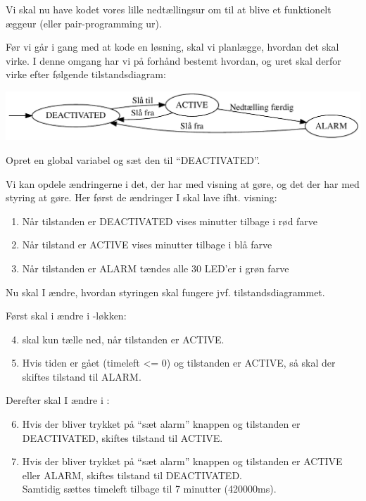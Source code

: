 \documentclass{ucph-handout}
\begin{document}
\begin{exercisebox}[adjusted title=Æggeur]
Vi skal nu have kodet vores lille nedtællingsur om til at blive et
funktionelt æggeur (eller pair-programming ur).

Før vi går i gang med at kode en løsning, skal vi planlægge, hvordan
det skal virke. I denne omgang har vi på forhånd bestemt hvordan, og
uret skal derfor virke efter følgende tilstandsdiagram:

\includegraphics[width=1.0\textwidth]{graphviz/alarm}

\noindent
Opret en global variabel  og sæt den til ``DEACTIVATED''.


Vi kan opdele ændringerne i det, der har med visning at gøre, og det
der har med styring at gøre. Her først de ændringer I skal lave
ifht. visning:

\begin{enumerate}
\item Når tilstanden er DEACTIVATED vises minutter tilbage i rød farve
\item Når tilstand er ACTIVE vises minutter tilbage i blå farve
\item Når tilstanden er ALARM tændes alle 30 LED'er i grøn farve
\end{enumerate}

\vspace{-3mm}
Nu skal I ændre, hvordan styringen skal fungere jvf. tilstandsdiagrammet.

Først skal i ændre i -løkken:
\begin{enumerate}
\setcounter{enumi}{3}
\item {} skal kun tælle ned, når tilstanden er ACTIVE.
\item Hvis tiden er gået (timeleft <= 0) og tilstanden er ACTIVE, så skal der skiftes tilstand til ALARM.
\end{enumerate}

\noindent
Derefter skal I ændre i :
\begin{enumerate}
    \setcounter{enumi}{5}
\item Hvis der bliver trykket på ``sæt alarm'' knappen og tilstanden er DEACTIVATED, skiftes tilstand til ACTIVE.
\item Hvis der bliver trykket på ``sæt alarm'' knappen og tilstanden er ACTIVE eller ALARM, skiftes tilstand til DEACTIVATED.
  \\
  Samtidig sættes timeleft tilbage til 7 minutter (420000ms).


\end{enumerate}
\end{exercisebox}
\end{document}
